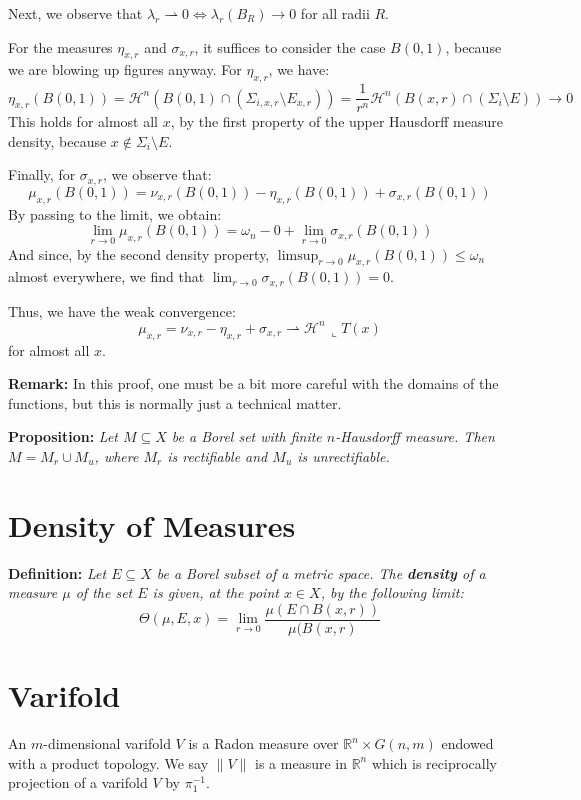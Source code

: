 \documentclass{article}
\begin{document}
\vspace{1ex}
Next, we observe that $\lambda_r\rightharpoonup 0\Leftrightarrow \lambda_r(B_R)\rightarrow 0$ for all radii $R$.

\vspace{1ex}
For the measures $\eta_{x,r}$ and $\sigma_{x,r}$, it suffices to consider the case $B(0,1)$, because we are blowing up figures anyway. For $\eta_{x,r}$, we have:
\[\eta_{x,r}(B(0, 1))=\mathcal H^n(B(0, 1)\cap(\Sigma_{i,x,r}\setminus E_{x,r}))=
\frac{1}{r^n}\mathcal H^n(B(x,r)\cap(\Sigma_i\setminus E))\rightarrow 0\]
This holds for almost all $x$, by the first property of the upper Hausdorff measure density, because $x \notin \Sigma_i \setminus E$.

\vspace{1ex}
Finally, for $\sigma_{x,r}$, we observe that:
\[\mu_{x,r}(B(0,1))=\nu_{x,r}(B(0,1))-\eta_{x,r}(B(0,1))+\sigma_{x,r}(B(0,1))\]
By passing to the limit, we obtain:
\[\lim_{r\to 0}\mu_{x,r}(B(0,1))=\omega_n-0+\lim_{r\to 0}\sigma_{x,r}(B(0,1))\]
And since, by the second density property, $\limsup_{r\to 0}\mu_{x,r}(B(0,1)) \le \omega_n$ almost everywhere, we find that $\lim_{r\to 0}\sigma_{x,r}(B(0,1))=0$.

Thus, we have the weak convergence:
\[\mu_{x,r}=\nu_{x,r}-\eta_{x,r}+\sigma_{x,r}\rightharpoonup\mathcal H^n\,\llcorner T(x)\]
for almost all $x$.

\vspace{1ex}
\textbf{Remark:} In this proof, one must be a bit more careful with the domains of the functions, but this is normally just a technical matter.

\vspace{2ex}
\textbf{Proposition:} \textit{Let $M\subseteq X$ be a Borel set with finite
$n$-Hausdorff measure. Then $M=M_r\cup M_u$, where $M_r$ is rectifiable
and $M_u$ is unrectifiable.}

\section{Density of Measures}

\textbf{Definition:} \textit{Let $E\subseteq X$ be a Borel subset of a metric
space. The \textbf{density} of a measure $\mu$ of the set $E$ is given, at the point $x\in 
X$, by the following limit:
\[\Theta(\mu, E, x)=\lim_{r\rightarrow 0}\frac{\mu(E\cap B(x,r))}{\mu(B(x,r)}\]
}

\section{Varifold}
An $m$-dimensional varifold $V$ is a Radon measure over $\mathbb{R}^n\times
G(n,m)$ endowed with a product topology. We say $\|V\|$ is a measure in
$\mathbb{R}^n$ which is reciprocally projection of a varifold $V$ by $\pi_1^{-1}$.
\end{document}
